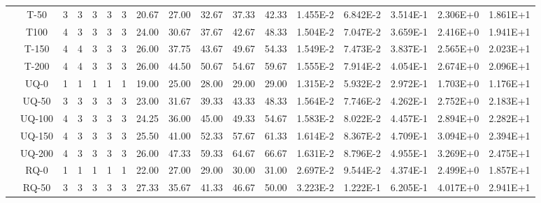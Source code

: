 \begin{table}[ht]
\begin{center}
{\begin{tabular}{cc|c|c|c|c|c|c|c|c|c|c|c|c|c|c|c|}
\multicolumn{1}{|c|}{}                      & \multicolumn{1}{|c|}{T-50} & 	3	&	3	&	3	&	3	&	3	&	20.67	&	27.00	&	32.67	&	37.33	&	42.33	&	1.455E-2	&	6.842E-2	&	3.514E-1	&	2.306E+0	&	1.861E+1	\\
\multicolumn{1}{|c|}{}                      & \multicolumn{1}{|c|}{T100} &	4	&	3	&	3	&	3	&	3	&	24.00	&	30.67	&	37.67	&	42.67	&	48.33	&	1.504E-2	&	7.047E-2	&	3.659E-1	&	2.416E+0	&	1.941E+1	\\
\multicolumn{1}{|c|}{}                      & \multicolumn{1}{|c|}{T-150} &	4	&	4	&	3	&	3	&	3	&	26.00	&	37.75	&	43.67	&	49.67	&	54.33	&	1.549E-2	&	7.473E-2	&	3.837E-1	&	2.565E+0	&	2.023E+1	\\
\multicolumn{1}{|c|}{}                      & \multicolumn{1}{|c|}{T-200} &	4	&	4	&	3	&	3	&	3	&	26.00	&	44.50	&	50.67	&	54.67	&	59.67	&	1.555E-2	&	7.914E-2	&	4.054E-1	&	2.674E+0	&	2.096E+1	\\
\cline{2-17}																														
\multicolumn{1}{|c|}{}                      & \multicolumn{1}{|c|}{UQ-0} &	1	&	1	&	1	&	1	&	1	&	19.00	&	25.00	&	28.00	&	29.00	&	29.00	&	1.315E-2	&	5.932E-2	&	2.972E-1	&	1.703E+0	&	1.176E+1	\\
\multicolumn{1}{|c|}{}                      & \multicolumn{1}{|c|}{UQ-50} &	3	&	3	&	3	&	3	&	3	&	23.00	&	31.67	&	39.33	&	43.33	&	48.33	&	1.564E-2	&	7.746E-2	&	4.262E-1	&	2.752E+0	&	2.183E+1	\\
\multicolumn{1}{|c|}{}                      & \multicolumn{1}{|c|}{UQ-100} &	4	&	3	&	3	&	3	&	3	&	24.25	&	36.00	&	45.00	&	49.33	&	54.67	&	1.583E-2	&	8.022E-2	&	4.457E-1	&	2.894E+0	&	2.282E+1	\\
\multicolumn{1}{|c|}{}                      & \multicolumn{1}{|c|}{UQ-150} &	4	&	3	&	3	&	3	&	3	&	25.50	&	41.00	&	52.33	&	57.67	&	61.33	&	1.614E-2	&	8.367E-2	&	4.709E-1	&	3.094E+0	&	2.394E+1	\\
\multicolumn{1}{|c|}{}                      & \multicolumn{1}{|c|}{UQ-200} &	4	&	3	&	3	&	3	&	3	&	26.00	&	47.33	&	59.33	&	64.67	&	66.67	&	1.631E-2	&	8.796E-2	&	4.955E-1	&	3.269E+0	&	2.475E+1	\\
\cline{2-17}																														
\multicolumn{1}{|c|}{}                      & \multicolumn{1}{|c|}{RQ-0} &	1	&	1	&	1	&	1	&	1	&	22.00	&	27.00	&	29.00	&	30.00	&	31.00	&	2.697E-2	&	9.544E-2	&	4.374E-1	&	2.499E+0	&	1.857E+1	\\
\multicolumn{1}{|c|}{}                      & \multicolumn{1}{|c|}{RQ-50} & 	3	&	3	&	3	&	3	&	3	&	27.33	&	35.67	&	41.33	&	46.67	&	50.00	&	3.223E-2	&	1.222E-1	&	6.205E-1	&	4.017E+0	&	2.941E+1	\\

\end{tabular}}
\end{center}
\end{table}

